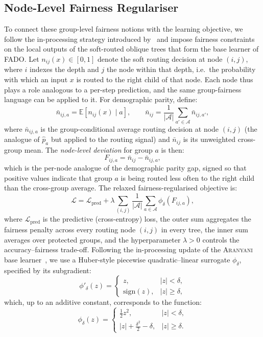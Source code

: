 \documentclass[sigconf,anonymous,review]{acmart}
\begin{document}
\subsection{Node-Level Fairness Regulariser}
\label{sec:problem:regulariser}
To connect these group-level fairness notions with the learning objective, we follow the in-processing strategy introduced
by~\cite{chowdhury2024enhancing} and impose fairness constraints on the local outputs of the soft-routed oblique trees that form the base learner of \textsc{FADO}. Let
$n_{ij}(x)\in[0,1]$ denote the soft routing decision at node $(i,j)$, where $i$ indexes the depth and $j$ the node within that depth, i.e.\ the probability with which an
input $x$ is routed to the right child of that node. Each node thus plays a role analogous to a per-step prediction, and the same group-fairness language can be applied to it.
For demographic parity, define:
\[
\bar{n}_{ij,a} = \mathbb{E}[n_{ij}(x) \mid a], \qquad
\bar{n}_{ij} = \frac{1}{|\mathcal{A}|}\sum_{a' \in \mathcal{A}} \bar{n}_{ij,a'},
\]
where $\bar{n}_{ij,a}$ is the group-conditional average routing decision at node $(i,j)$ (the analogue of $\hat{p}_a$ but applied to the routing signal) and $\bar{n}_{ij}$ is its
unweighted cross-group mean. The \emph{node-level deviation} for group $a$ is then:
\[
F_{ij,a} = \bar{n}_{ij} - \bar{n}_{ij,a},
\]
which is the per-node analogue of the demographic parity gap, signed so that positive values indicate that group $a$ is being routed less often to the right child than the
cross-group average. The relaxed fairness-regularised objective is:
\[
\mathcal{L} = \mathcal{L}_{\text{pred}} + \lambda \sum_{(i,j)} \frac{1}{|\mathcal{A}|}\sum_{a \in \mathcal{A}} \phi_{\delta}(F_{ij,a}),
\]
where $\mathcal{L}_{\text{pred}}$ is the predictive (cross-entropy) loss, the outer sum aggregates the fairness penalty across every routing node $(i,j)$ in every tree,
the inner sum averages over protected groups, and the hyperparameter $\lambda > 0$ controls the accuracy--fairness trade-off. Following the in-processing update of the
\textsc{Aranyani} base learner~\cite{chowdhury2024enhancing}, we use a Huber-style piecewise quadratic--linear surrogate $\phi_\delta$, specified by its subgradient:
\[
\phi'_{\delta}(z) =
\begin{cases}
z, & |z| < \delta, \\
\mathrm{sign}(z), & |z| \ge \delta,
\end{cases}
\]
which, up to an additive constant, corresponds to the function:
\[
\phi_{\delta}(z) =
\begin{cases}
\tfrac{1}{2}z^2, & |z| < \delta, \\
|z| + \tfrac{\delta^2}{2} - \delta, & |z| \ge \delta.
\end{cases}
\]
\end{document}

